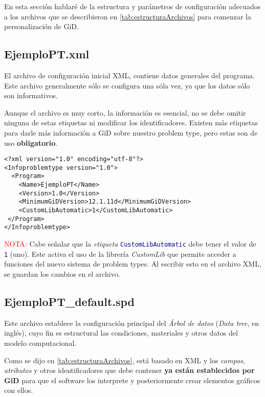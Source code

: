 \documentclass[10pt, a4paper, twocolumn]{article} %
\begin{document}
En esta sección hablaré de la estructura y parámetros de configuración adecuados a los archivos que se describieron en \ref{tab:estructuraArchivos} para comenzar la personalización de GiD.

\subsection{EjemploPT.xml}

El archivo de configuración inicial XML, contiene datos generales del programa. Este archivo generalmente sólo se configura una sóla vez, ya que los datos sólo son informativos.

Aunque el archivo es muy corto, la información es esencial, no se debe omitir ninguna de estas etiquetas ni modificar los identificadores. Existen más etiquetas para darle más información a GiD sobre nuestro problem type, pero estas son de uso \textbf{obligatorio}.

\lstset{language=XML} 
\begin{lstlisting}
<?xml version="1.0" encoding="utf-8"?>
<Infoproblemtype version="1.0">
  <Program>
    <Name>EjemploPT</Name>
    <Version>1.0</Version>   
    <MinimumGiDVersion>12.1.11d</MinimumGiDVersion>
    <CustomLibAutomatic>1</CustomLibAutomatic>
 </Program>
</Infoproblemtype>
\end{lstlisting}

\textcolor{red}{NOTA:} Cabe señalar que la \textit{etiqueta} \texttt{\textcolor{darkblue}{CustomLibAutomatic}} debe tener el valor de \texttt{\textcolor{darkblue}{1}} (uno). Este activa el uso de la librería \textit{CustomLib} que permite acceder a funciones del nuevo sistema de problem types.
Al escribir esto en el archivo XML, se guardan los cambios en el archivo.

\subsection{EjemploPT\_default.spd}

Este archivo establece la configuración principal del \textit{Árbol de datos} (\textit{Data tree}, en inglés), cuyo fin es estructural las condiciones, materiales y otros datos del modelo computacional.

Como se dijo en \ref{tab:estructuraArchivos}, está basado en XML y los \textit{campos}, \textit{atributos} y otros identificadores que debe contener \textbf{ya están establecidos por GiD} para que el software los interprete y posteriormente crear elementos gráficos con ellos.
\end{document}
